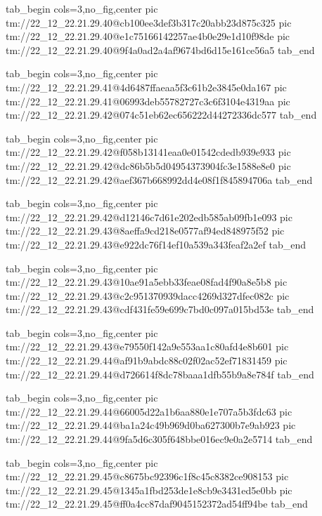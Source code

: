 \ifcmt
  tab_begin cols=3,no_fig,center
    pic tm://22_12_22.21.29.40@cb100ee3def3b317c20abb23d875c325
    pic tm://22_12_22.21.29.40@e1c75166142257ae4b0e29e1d10f98de
    pic tm://22_12_22.21.29.40@9f4a0ad2a4af9674bd6d15e161ce56a5
  tab_end
\fi


\ifcmt
  tab_begin cols=3,no_fig,center
    pic tm://22_12_22.21.29.41@4d6487ffaeaa5f3c61b2e3845e0da167
    pic tm://22_12_22.21.29.41@06993deb55782727c3c6f3104e4319aa
    pic tm://22_12_22.21.29.42@074c51eb62ec656222d44272336dc577
  tab_end
\fi


\ifcmt
  tab_begin cols=3,no_fig,center
    pic tm://22_12_22.21.29.42@f058b13141eaa0e01542cdedb939e933
    pic tm://22_12_22.21.29.42@dc86b5b5d04954373904fc3e1588e8e0
    pic tm://22_12_22.21.29.42@aef367b668992dd4e08f1f845894706a
  tab_end
\fi


\ifcmt
  tab_begin cols=3,no_fig,center
    pic tm://22_12_22.21.29.42@d12146c7d61e202edb585ab09fb1e093
    pic tm://22_12_22.21.29.43@8aeffa9cd218e0577af94ed848975f52
    pic tm://22_12_22.21.29.43@e922dc76f14ef10a539a343feaf2a2ef
  tab_end
\fi


\ifcmt
  tab_begin cols=3,no_fig,center
    pic tm://22_12_22.21.29.43@10ae91a5ebb33feae08fad4f90a8e5b8
    pic tm://22_12_22.21.29.43@c2c951370939dacc4269d327dfec082c
    pic tm://22_12_22.21.29.43@cdf431fe59e699c7bd0c097a015bd53e
  tab_end
\fi


\ifcmt
  tab_begin cols=3,no_fig,center
    pic tm://22_12_22.21.29.43@e79550f142a9e553aa1c80afd4e8b601
    pic tm://22_12_22.21.29.44@af91b9abdc88c02f02ac52ef71831459
    pic tm://22_12_22.21.29.44@d726614f8dc78baaa1dfb55b9a8e784f
  tab_end
\fi


\ifcmt
  tab_begin cols=3,no_fig,center
    pic tm://22_12_22.21.29.44@66005d22a1b6aa880e1e707a5b3fdc63
    pic tm://22_12_22.21.29.44@ba1a24c49b969d0ba627300b7e9ab923
    pic tm://22_12_22.21.29.44@9fa5d6c305f648bbe016ec9e0a2e5714
  tab_end
\fi


\ifcmt
  tab_begin cols=3,no_fig,center
    pic tm://22_12_22.21.29.45@c8675bc92396c1f8c45c8382ce908153
    pic tm://22_12_22.21.29.45@1345a1fbd253de1e8cb9e3431ed5e0bb
    pic tm://22_12_22.21.29.45@ff0a4cc87daf9045152372ad54ff94be
  tab_end
\fi

